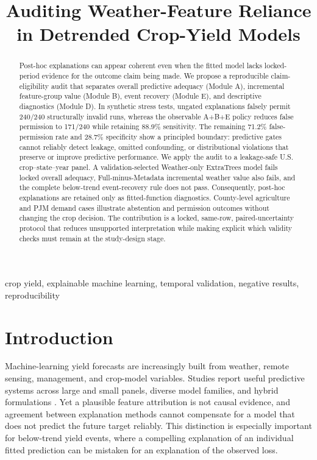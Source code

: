 \documentclass[conference]{IEEEtran}
\title{Auditing Weather-Feature Reliance in Detrended Crop-Yield Models}
\author{\IEEEauthorblockN{Anonymous Submission}}
\begin{document}
\maketitle

\begin{abstract}
Post-hoc explanations can appear coherent even when the fitted model lacks
locked-period evidence for the outcome claim being made. We propose a
reproducible claim-eligibility audit that separates overall predictive adequacy
(Module A), incremental feature-group value (Module B), event recovery (Module
E), and descriptive diagnostics (Module D). In synthetic stress tests, ungated
explanations falsely permit 240/240 structurally invalid runs, whereas the
observable A+B+E policy reduces false permission to 171/240 while retaining
88.9\% sensitivity. The remaining 71.2\% false-permission rate and 28.7\%
specificity show a principled boundary: predictive gates cannot reliably detect
leakage, omitted confounding, or distributional violations that preserve or
improve predictive performance. We apply the audit to a leakage-safe U.S.
crop--state--year panel. A validation-selected Weather-only ExtraTrees model
fails locked overall adequacy, Full-minus-Metadata incremental weather value
also fails, and the complete below-trend event-recovery rule does not pass.
Consequently, post-hoc explanations are retained only as fitted-function
diagnostics. County-level agriculture and PJM demand cases illustrate abstention
and permission outcomes without changing the crop decision. The contribution is a locked, same-row, paired-uncertainty protocol
that reduces unsupported interpretation while making explicit which validity
checks must remain at the study-design stage.
\end{abstract}

\begin{IEEEkeywords}
crop yield, explainable machine learning, temporal validation, negative results,
reproducibility
\end{IEEEkeywords}

\section{Introduction}
Machine-learning yield forecasts are increasingly built from weather, remote
sensing, management, and crop-model variables. Studies report useful predictive
systems across large and small panels, diverse model families, and hybrid
formulations \cite{Paudel2021,Meroni2021,LengHall2020,Klompenburg2020}.
Yet a plausible feature attribution is not causal evidence, and agreement between
explanation methods cannot compensate for a model that does not predict the future
target reliably. This distinction is especially important for below-trend yield
events, where a compelling explanation of an individual fitted prediction can be
mistaken for an explanation of the observed loss.
\end{document}
